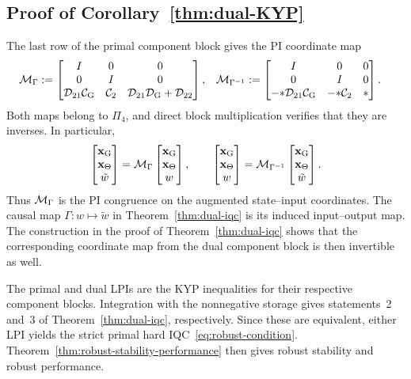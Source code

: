 \subsection{Proof of Corollary~\ref{thm:dual-KYP}}\label{proof:dual-KYP}
The last row of the primal component block gives the PI coordinate map
\begin{equation*}
\begin{aligned}
\mathcal{M}_\Gamma
&:=\begin{bmatrix}
I&0&0\\
0&I&0\\
\mathcal{D}_{21}\mathcal{C}_{{\mathrm{G}}}&\mathcal{C}_2
&\mathcal{D}_{21}\mathcal{D}_{{\mathrm{G}}}+\mathcal{D}_{22}
\end{bmatrix},
&
\mathcal{M}_{\Gamma^{-1}}
&:=\begin{bmatrix}
I&0&0\\
0&I&0\\
-\mathcal{\Lambda}\mathcal{D}_{21}\mathcal{C}_{{\mathrm{G}}}&-\mathcal{\Lambda}\mathcal{C}_2&\mathcal{\Lambda}
\end{bmatrix}.
\end{aligned}
\end{equation*}
Both maps belong to $\Pi_4$, and direct block multiplication verifies that
they are inverses. In particular,
\begin{equation*}
\begin{bmatrix}\mathbf{x}_{{\mathrm{G}}}\\\mathbf{x}_\Theta\\\tilde w\end{bmatrix}
=\mathcal{M}_\Gamma
\begin{bmatrix}\mathbf{x}_{{\mathrm{G}}}\\\mathbf{x}_\Theta\\w\end{bmatrix},
\qquad
\begin{bmatrix}\mathbf{x}_{{\mathrm{G}}}\\\mathbf{x}_\Theta\\w\end{bmatrix}
=\mathcal{M}_{\Gamma^{-1}}
\begin{bmatrix}\mathbf{x}_{{\mathrm{G}}}\\\mathbf{x}_\Theta\\\tilde w\end{bmatrix}.
\end{equation*}
Thus $\mathcal{M}_\Gamma$ is the PI congruence on the augmented
state--input coordinates. The causal map $\Gamma:w\mapsto\tilde w$ in
Theorem~\ref{thm:dual-iqc} is its induced input--output map. The construction
in the proof of
Theorem~\ref{thm:dual-iqc} shows that the corresponding coordinate map from
the dual component block is then invertible as well.

The primal and dual LPIs are the KYP inequalities for their respective
component blocks. Integration with the nonnegative storage gives statements~2
and~3 of Theorem~\ref{thm:dual-iqc}, respectively. Since these are equivalent,
either LPI yields
the strict primal hard IQC~\eqref{eq:robust-condition}.
Theorem~\ref{thm:robust-stability-performance}
then gives robust stability and robust performance.
